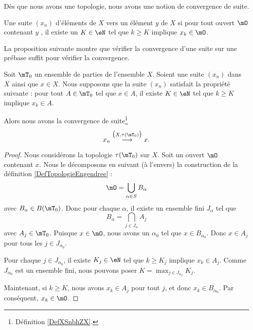 Dès que nous avons une topologie, nous avons une notion de convergence de suite.
\begin{definition} \label{DefXSnbhZX}
	Une suite \( (x_n)\) d'éléments de \( X\)  vers un élément \( y\) de \( X\) si pour tout ouvert \(\mO \)  contenant \( y\) , il existe un \( K\in \eN\) tel que \( k\geq K\) implique \( x_k\in\mO\).
\end{definition}

La proposition suivante montre que vérifier la convergence d'une suite sur une prébase suffit pour vérifier la convergence.
\begin{proposition}     \label{PROPooJTJBooNtczsO}
	Soit \( \mT_0\) un ensemble de parties de l'ensemble \( X\). Soient une suite \( (x_n)\) dans \( X\) ainsi que \( x\in X\). Nous supposons que la suite \( (x_n)\) satisfait la propriété suivante : pour tout \( A\in \mT_0\) tel que \( x\in A\), il existe \( K\in \eN\) tel que \( k\geq K\) implique \( x_k\in A\).

	Alors nous avons la convergence de suite\footnote{Définition \ref{DefXSnbhZX}.}
	\begin{equation}
		x_n\stackrel{\big( X,\tau(\mT_0) \big)}{\longrightarrow}x.
	\end{equation}
\end{proposition}

\begin{proof}
	Nous considérons la topologie \( \tau(\mT_0)\) sur \( X\). Soit un ouvert \( \mO\) contenant \( x\). Nous le décomposons en suivant (à l'envers) la construction de la définition \ref{DefTopologieEngendree} :
	\begin{equation}
		\mO=\bigcup_{\alpha\in S}B_{\alpha}
	\end{equation}
	avec \( B_{\alpha}\in B(\mT_0)\). Donc pour chaque \( \alpha\), il existe un ensemble fini \( J_{\alpha}\) tel que
	\begin{equation}
		B_{\alpha}=\bigcap_{j\in J_{\alpha}}A_j
	\end{equation}
	avec \( A_j\in \mT_0\). Puisque \( x\in \mO\), nous avons un \( \alpha_0\) tel que \( x\in B_{\alpha_0}\). Donc \( x\in A_j\) pour tous les \( j\in J_{\alpha_0}\).

	Pour chaque \( j\in J_{\alpha_0}\), il existe \( K_j\in \eN\) tel que \( k\geq K_j\) implique \( x_k\in A_j\). Comme \( J_{\alpha_0}\) est un ensemble fini, nous pouvons poser \( K=\max_{j\in J_{\alpha_0}}K_j\).

	Maintenant, si \( k\geq K\), nous avons \( x_k\in A_j\) pour tout \( j\), et donc \( x_k\in B_{\alpha_0}\). Par conséquent, \( x_k\in \mO\).
\end{proof}


